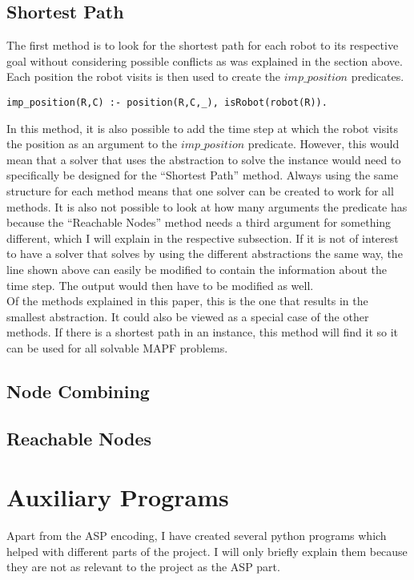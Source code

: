 \documentclass[runningheads]{llncs}
\begin{document}
\subsection{Shortest Path}
The first method is to look for the shortest path for each robot to its respective goal without considering possible conflicts as was explained in the section above. Each position the robot visits is then used to create the $imp\_position$ predicates. 
\begin{verbatim}
imp_position(R,C) :- position(R,C,_), isRobot(robot(R)).
\end{verbatim}
In this method, it is also possible to add the time step at which the robot visits the position as an argument to the $imp\_position$ predicate. However, this would mean that a solver that uses the abstraction to solve the instance would need to specifically
be designed for the ``Shortest Path'' method. Always using the same structure for each method means that one solver can be created to work for all methods. It is also not possible to look at how many arguments the predicate has because the 
``Reachable Nodes'' method needs a third argument for something different, which I will explain in the respective subsection. If it is not of interest to have a solver that solves by using the different abstractions the same way, the line shown above can 
easily be modified to contain the information about the time step. The output would then have to be modified as well. \\
Of the methods explained in this paper, this is the one that results in the smallest abstraction. It could also be viewed as a special case of the other methods. If there is a shortest path in an instance, this method will find it so it can be used for all solvable
MAPF problems.
\subsection{Node Combining}
\subsection{Reachable Nodes}

\section{Auxiliary Programs}
Apart from the ASP encoding, I have created several python programs which helped with different parts of the project. I will only briefly explain them because they are not as relevant to the project as the ASP part.
\end{document}
